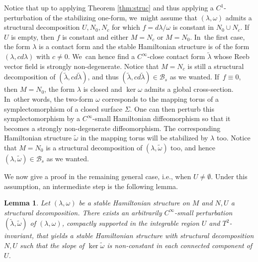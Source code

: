 \documentclass[11pt]{article}
\newcommand{\ie}{i.e.,\xspace}
\newtheorem{lemma}[theorem]{Lemma}
\theoremstyle{definition}
\begin{document}
Notice that up to applying Theorem \ref{thm:struc} and thus applying a $C^1$-perturbation of the stabilizing one-form, we~might assume that $(\lambda,\omega)$ admits a structural decomposition $U, N_0, N_c$ for which $f=d\lambda/\omega$ is constant in $N_0\cup N_c$. If~$U$ is empty, then $f$ is constant and either $M=N_c$ or $M=N_0$. In~the first case, the form $\lambda$ is a contact form and the stable Hamiltonian structure is of the form $(\lambda, cd\lambda)$ with $c\neq 0$. We~can hence find a $C^\infty$-close contact form $\widetilde \lambda$ whose Reeb vector field is strongly non-degenerate. Notice that $M=N_c$ is still a structural decomposition of $(\tilde \lambda, cd\tilde \lambda)$, and thus $(\tilde \lambda, cd\tilde \lambda) \in \mathcal{B}_s$ as we wanted. If~$f\equiv 0$, then $M=N_0$, the form $\lambda$ is closed and $\ker \omega$ admits a global cross-section. In~other words, the two-form $\omega$ corresponds to the mapping torus of a symplectomorphism of a closed surface $\Sigma$. One can then perturb this symplectomorphism by a $C^\infty$-small Hamiltonian diffeomorphism so that it becomes a strongly non-degenerate diffeomorphism. The corresponding Hamiltonian structure $\tilde \omega$ in the mapping torus will be stabilized by $\lambda$ too. Notice that $M=N_0$ is a structural decomposition of $(\lambda, \tilde \omega)$ too, and hence $(\lambda,\tilde \omega)\in \mathcal{B}_s$ as we wanted.

We now give a proof in the remaining general case, \ie when $U\neq \emptyset$. Under this assumption, an intermediate step is the following lemma.

\begin{lemma}\label{lem:nonconstantslope}
Let $(\lambda,\omega)$ be a stable Hamiltonian structure on $M$ and $N,U$ a structural decomposition. There exists an arbitrarily $C^\infty$-small perturbation $(\widetilde \lambda,\widetilde \omega)$ of $(\lambda,\omega)$, compactly supported in the integrable region $U$ and $T^2$-invariant, that yields a stable Hamiltonian structure with structural decomposition $N,U$ such that the slope of $\ker \widetilde \omega$ is non-constant in each connected component of $U$.
\end{lemma}
\end{document}
